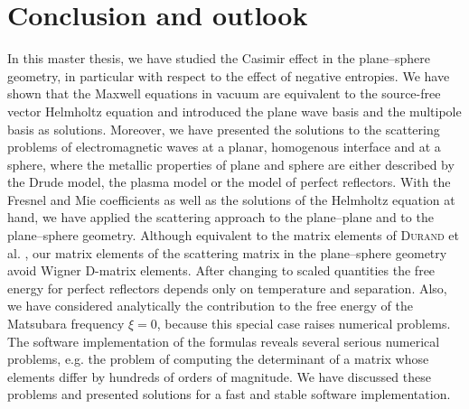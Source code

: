 \chapter{Conclusion and outlook}

In this master thesis, we have studied the Casimir effect in the plane--sphere
geometry, in particular with respect to the effect of negative entropies. We
have shown that the Maxwell equations in vacuum are equivalent to the
source-free vector Helmholtz equation and introduced the plane wave basis and
the multipole basis as solutions. Moreover, we have presented the solutions to
the scattering problems of electromagnetic waves at a planar, homogenous
interface and at a sphere, where the metallic properties of plane and sphere
are either described by the Drude model, the plasma model or the model of
perfect reflectors. With the Fresnel and Mie coefficients as well as the
solutions of the Helmholtz equation at hand, we have applied the scattering
approach to the plane--plane and to the plane--sphere geometry. Although
equivalent to the matrix elements of \textsc{Durand} et al. \cite{Durand,
ThermalCasimirEffect}, our matrix elements of the scattering matrix in the
plane--sphere geometry avoid Wigner D-matrix elements. After changing to scaled
quantities the free energy for perfect reflectors depends only on temperature
and separation. Also, we have considered analytically the contribution to the
free energy of the Matsubara frequency $\xi=0$, because this special case
raises numerical problems. The software implementation of the formulas reveals
several serious numerical problems, e.g. the problem of computing the
determinant of a matrix whose elements differ by hundreds of orders of
magnitude. We have discussed these problems and presented solutions for a fast
and stable software implementation.

